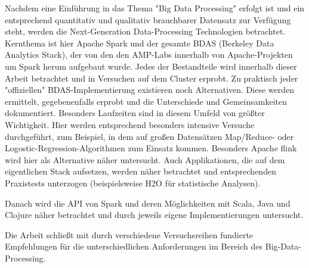 \documentclass[11pt, a4paper]{book}
\begin{document}
Nachdem eine Einführung in das Thema "Big Data Processing" erfolgt ist und ein entsprechend quantitativ und qualitativ brauchbarer Datensatz zur Verfügung steht, werden die Next-Generation Data-Processing Technologien betrachtet. Kernthema ist hier Apache Spark und der gesamte BDAS (Berkeley Data Analytics Stack), der von den den AMP-Labs innerhalb von Apache-Projekten um Spark herum aufgebaut wurde. Jedes der Bestandteile wird innerhalb dieser Arbeit betrachtet und in Versuchen auf dem Cluster erprobt. Zu praktisch jeder "offiziellen" BDAS-Implementierung existieren noch Alternativen. Diese werden ermittelt, gegebenenfalls erprobt und die Unterschiede und Gemeinsamkeiten dokumentiert. Besonders Laufzeiten sind in diesem Umfeld von größter Wichtigkeit. Hier werden entsprechend besonders intensive Versuche durchgeführt, zum Beispiel, in dem auf großen Datensätzen Map/Reduce- oder Logostic-Regression-Algorithmen zum Einsatz kommen. Besonders Apache flink wird hier als Alternative näher untersucht. Auch Applikationen, die auf dem eigentlichen Stack aufsetzen, werden näher betrachtet und entsprechenden Praxistests unterzogen (beispielsweise H2O für statistische Analysen). 

Danach wird die API von Spark und deren Möglichkeiten mit Scala, Java und Clojure näher betrachtet und durch jeweils eigene Implementierungen untersucht. 

Die Arbeit schließt mit durch verschiedene Versuchsreihen fundierte Empfehlungen für die unterschiedlichen Anforderungen im Bereich des Big-Data-Processing.
\end{document}
